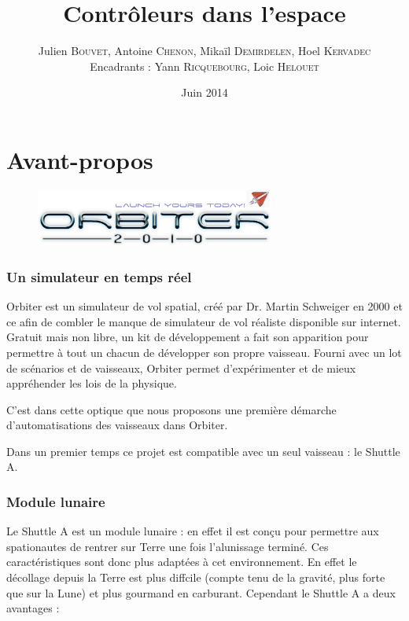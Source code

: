 \documentclass[a4paper,11pt]{report}
\title{\textbf{Contrôleurs dans l'espace}}
\author{Julien \textsc{Bouvet}, Antoine \textsc{Chenon}, Mikaïl \textsc{Demirdelen}, Hoel \textsc{Kervadec}
        \\
        Encadrants : Yann \textsc{Ricquebourg}, Loic \textsc{Helouet}}
\date{Juin 2014}
\begin{document}
          

\maketitle                
\part{Avant-propos}

\begin{figure}[!h]
            \begin{center}
                \includegraphics[width=0.7\textwidth]{img/orbiter_logo.png}
            \end{center}
\end{figure}

\section{Un simulateur en temps réel}

Orbiter est un simulateur de vol spatial, créé par Dr. Martin Schweiger en 2000 et ce afin de combler le manque de simulateur de vol réaliste disponible sur internet. Gratuit mais non libre, un kit de développement a fait son apparition pour permettre à tout un chacun de développer son propre vaisseau. Fourni avec un lot de scénarios et de vaisseaux, Orbiter permet d'expérimenter et de mieux appréhender les lois de la physique.

C'est dans cette optique que nous proposons une première démarche d'automatisations des vaisseaux dans Orbiter.

Dans un premier temps ce projet est compatible avec un seul vaisseau : le Shuttle A.

\section{Module lunaire}

Le Shuttle A est un module lunaire : en effet il est conçu pour permettre aux spationautes de rentrer sur Terre une fois l'alunissage terminé. Ces caractéristiques sont donc plus adaptées à cet environnement. En effet le décollage depuis la Terre est plus diffcile (compte tenu de la gravité, plus forte que sur la Lune) et plus gourmand en carburant. Cependant le Shuttle A a deux avantages :
\end{document}
